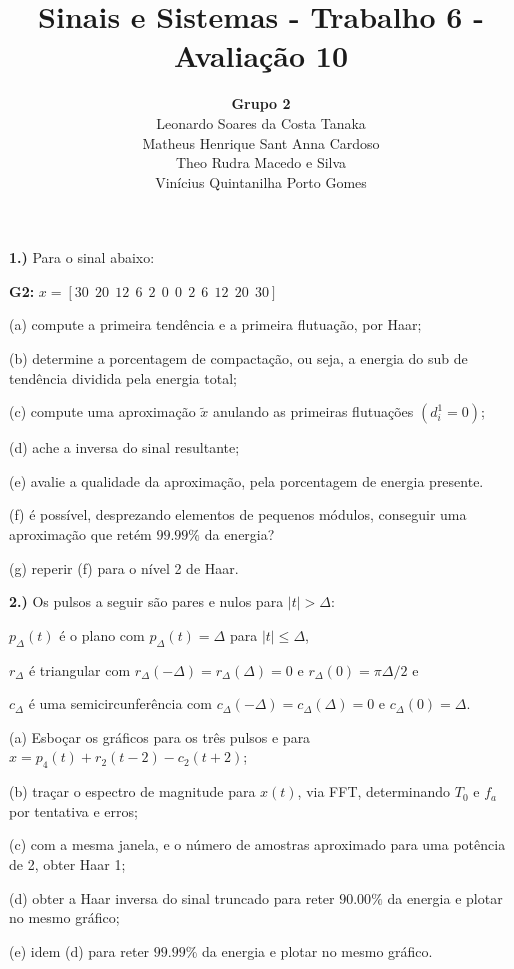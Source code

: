 \documentclass[10pt]{article}
\title{Sinais e Sistemas - Trabalho 6 - Avaliação 10}
\author{
    \textbf{Grupo 2}\\
    Leonardo Soares da Costa Tanaka\\
    Matheus Henrique Sant Anna Cardoso\\
    Theo Rudra Macedo e Silva\\
    Vinícius Quintanilha Porto Gomes
}
\date{}
\begin{document}
\maketitle
\thispagestyle{capa}
\newpage

\textbf{1.)} Para o sinal abaixo:

\textbf{G2: } $x = [30 \ \ 20 \ \ 12 \ \ 6 \ \ 2 \ \ 0 \ \ 0 \ \ 2 \ \ 6 \ \ 12 \ \ 20 \ \ 30]$

(a) compute a primeira tendência e a primeira flutuação, por Haar;

(b) determine a porcentagem de compactação, ou seja, a energia do sub de tendência dividida pela energia total;

(c) compute uma aproximação $\tilde{x}$ anulando as primeiras flutuações $(d_i^1 = 0)$;

(d) ache a inversa do sinal resultante;

(e) avalie a qualidade da aproximação, pela porcentagem de energia presente.

(f) é possível, desprezando elementos de pequenos módulos, conseguir uma aproximação que retém $99.99\%$ da energia?

(g) reperir (f) para o nível 2 de Haar.

\vspace{\baselineskip}

\textbf{2.)} Os pulsos a seguir são pares e nulos para $|t| > \Delta:$

$p_{\Delta}(t)$ é o plano com $p_{\Delta}(t) = \Delta$ para $|t| \leq \Delta$,

$r_{\Delta}$ é triangular com $r_{\Delta}(-\Delta) = r_{\Delta}(\Delta) = 0$ e $r_{\Delta}(0) = \pi \Delta / 2$ e

$c_{\Delta}$ é uma semicircunferência com $c_{\Delta}(-\Delta) = c_{\Delta}(\Delta) = 0$ e $c_{\Delta}(0) = \Delta$.

\vspace{\baselineskip}

(a) Esboçar os gráficos para os três pulsos e para $x = p_4(t) + r_2(t - 2) - c_2(t + 2)$;

(b) traçar o espectro de magnitude para $x(t)$, via FFT, determinando $T_0$ e $f_a$ por tentativa e erros;

(c) com a mesma janela, e o número de amostras aproximado para uma potência de 2, obter Haar 1;

(d) obter a Haar inversa do sinal truncado para reter $90.00\%$ da energia e plotar no mesmo gráfico;

(e) idem (d) para reter $99.99\%$ da energia e plotar no mesmo gráfico.
\end{document}
